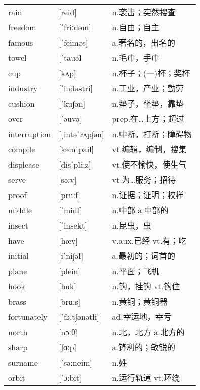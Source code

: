 \documentclass[a4paper]{article}
\begin{document}
\section{}
\begin{tabular}{l l l}

raid & [reid] & n.袭击；突然搜查 \\
freedom & [ˈfriːdəm] & n.自由；自主 \\
famous & [ˈfeiməs] & a.著名的，出名的 \\
towel & [ˈtauəl & n.毛巾，手巾 \\
cup & [kʌp] & n.杯子；(一)杯；奖杯 \\
industry & [ˈindəstri] & n.工业，产业；勤劳 \\
cushion & [ˈku∫ən] & n.垫子，坐垫，靠垫 \\
over & [ˈəuvə] & prep.在…上方；超过 \\
interruption & [ˌintəˈrʌp∫ən] & n.中断，打断；障碍物 \\
compile & [kəmˈpail] & vt.编辑，编制，搜集 \\
displease & [disˈpliːz] & vt.使不愉快，使生气 \\
serve & [səːv] & vt.为…服务；招待 \\
proof & [pruːf] & n.证据；证明；校样 \\
middle & [ˈmidl] & n.中部 a.中部的 \\
insect & [ˈinsekt] & n.昆虫，虫 \\
have & [hæv] & v.aux.已经 vt.有；吃 \\
initial & [iˈni∫əl] & a.最初的；词首的 \\
plane & [plein] & n.平面；飞机 \\
hook & [huk] & n.钩，挂钩 vt.钩住 \\
brass & [brɑːs] & n.黄铜；黄铜器 \\
fortunately & [ˈfɔːt∫ənətli] & ad.幸运地，幸亏 \\
north & [nɔːθ] & n.北，北方 a.北方的 \\
sharp & [∫ɑːp] & a.锋利的；敏锐的 \\
surname & [ˈsəːneim] & n.姓 \\
orbit & [ˈɔːbit] & n.运行轨道 vt.环绕 \\

\end{tabular}
\end{document}

